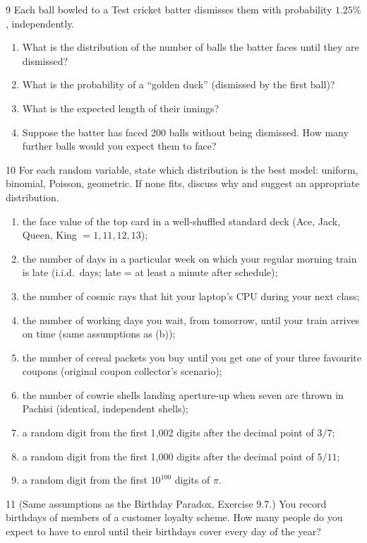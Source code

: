 \begin{exercise}{9}
    Each ball bowled to a Test cricket batter dismisses them with probability
    $1.25\%$, independently.
    \begin{enumerate}[label=(\alph*)]
        \item What is the distribution of the number of balls the batter faces
              until they are dismissed?
        \item What is the probability of a ``golden duck'' (dismissed by the
              first ball)?
        \item What is the expected length of their innings?
        \item Suppose the batter has faced 200 balls without being dismissed.
              How many further balls would you expect them to face?
    \end{enumerate}
\end{exercise}

\begin{exercise}{10}
    For each random variable, state which distribution is the best model:
    uniform, binomial, Poisson, geometric. If none fits, discuss why and suggest
    an appropriate distribution.
    \begin{enumerate}[label=(\alph*)]
        \item the face value of the top card in a well-shuffled standard deck
              (Ace, Jack, Queen, King $=1,11,12,13$);
        \item the number of days in a particular week on which your regular
              morning train is late (i.i.d.\ days; late = at least a minute after
              schedule);
        \item the number of cosmic rays that hit your laptop's CPU during your
              next class;
        \item the number of working days you wait, from tomorrow, until your
              train arrives on time (same assumptions as (b));
        \item the number of cereal packets you buy until you get one of your
              three favourite coupons (original coupon collector's scenario);
        \item the number of cowrie shells landing aperture-up when seven are
              thrown in Pachisi (identical, independent shells);
        \item a random digit from the first 1{,}002 digits after the decimal
              point of $3/7$;
        \item a random digit from the first 1{,}000 digits after the decimal
              point of $5/11$;
        \item a random digit from the first $10^{100}$ digits of $\pi$.
    \end{enumerate}
\end{exercise}

\begin{exercise}{11}
    (Same assumptions as the Birthday Paradox, Exercise 9.7.) You record
    birthdays of members of a customer loyalty scheme. How many people do you
    expect to have to enrol until their birthdays cover every day of the year?
\end{exercise}
